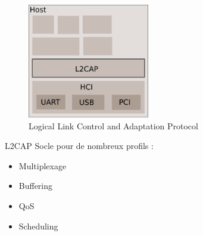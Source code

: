 \begin{frame}
	\begin{minipage}[t]{0.60\linewidth}
		\begin{figure}
			\includegraphics[height=5cm]{arch_log_l2cap.png}
			\caption{Logical Link Control and Adaptation Protocol}
		\end{figure}
	\end{minipage}
	\begin{minipage}[t]{0.30\linewidth}
		\begin{block}{L2CAP}
			Socle pour de nombreux profils :
			\begin{itemize}
				\item Multiplexage
				\item Buffering
				\item QoS
				\item Scheduling
			\end{itemize}
		\end{block}
	\end{minipage}
\end{frame}

